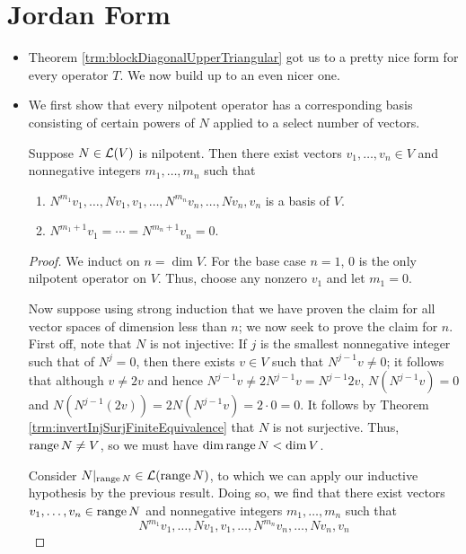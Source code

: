 \documentclass[../main.tex]{subfiles}
\begin{document}
\section{Jordan Form}
\begin{itemize}
    \item Theorem \ref{trm:blockDiagonalUpperTriangular} got us to a pretty nice form for every operator $T$. We now build up to an even nicer one.
    \item We first show that every nilpotent operator has a corresponding basis consisting of certain powers of $N$ applied to a select number of vectors.
    \begin{theorem}\label{trm:nilpotentJordanBasis}
        Suppose $N\in\mathcal{L}(V)$ is nilpotent. Then there exist vectors $v_1,\dots,v_n\in V$ and nonnegative integers $m_1,\dots,m_n$ such that
        \begin{enumerate}[label={\textup{(}\alph*\textup{)}}]
            \item $N^{m_1}v_1,\dots,Nv_1,v_1,\dots,N^{m_n}v_n,\dots,Nv_n,v_n$ is a basis of $V$.
            \item $N^{m_1+1}v_1=\cdots=N^{m_n+1}v_n=0$.
        \end{enumerate}
        \begin{proof}
            We induct on $n=\dim V$. For the base case $n=1$, 0 is the only nilpotent operator on $V$. Thus, choose any nonzero $v_1$ and let $m_1=0$.\par\smallskip
            Now suppose using strong induction that we have proven the claim for all vector spaces of dimension less than $n$; we now seek to prove the claim for $n$. First off, note that $N$ is not injective: If $j$ is the smallest nonnegative integer such that of $N^j=0$, then there exists $v\in V$ such that $N^{j-1}v\neq 0$; it follows that although $v\neq 2v$ and hence $N^{j-1}v\neq 2N^{j-1}v=N^{j-1}2v$, $N(N^{j-1}v)=0$ and $N(N^{j-1}(2v))=2N(N^{j-1}v)=2\cdot 0=0$. It follows by Theorem \ref{trm:invertInjSurjFiniteEquivalence} that $N$ is not surjective. Thus, $\operatorname{range} N\neq V$, so we must have $\dim\operatorname{range} N<\dim V$.\par
            Consider $N|_{\operatorname{range} N}\in\mathcal{L}(\operatorname{range} N)$, to which we can apply our inductive hypothesis by the previous result. Doing so, we find that there exist vectors $v_1,\dots,v_n\in\operatorname{range} N$ and nonnegative integers $m_1,\dots,m_n$ such that
            \begin{equation}\label{eqn:8.1}
                N^{m_1}v_1,\dots,Nv_1,v_1,\dots,N^{m_n}v_n,\dots,Nv_n,v_n
            \end{equation}

\end{proof}
\end{theorem}
\end{itemize}
\end{document}
